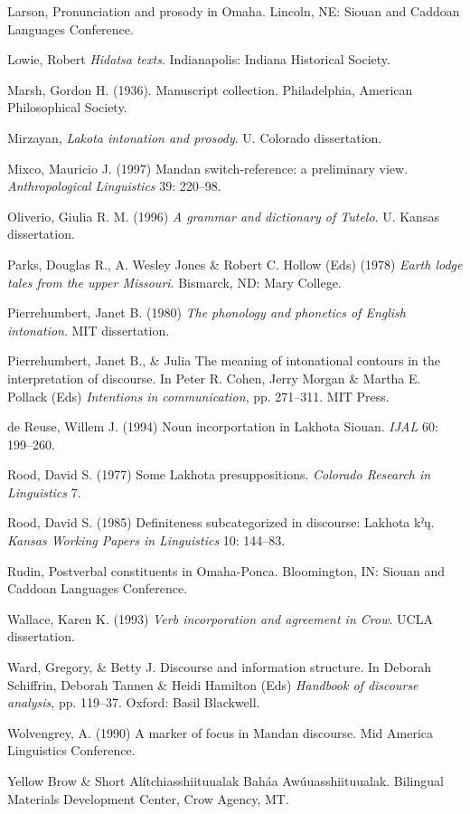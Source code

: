 \documentclass[output=paper]{LSP/langsci}
\begin{document}
\begin{reflist}
Larson, \citet{Rory2009} Pronunciation and prosody in Omaha. Lincoln, NE: Siouan and Caddoan Languages Conference. 

Lowie, Robert \citet{Harry1939} \emph{Hidatsa texts}. Indianapolis: Indiana Historical Society.

Marsh, Gordon H. (1936). Manuscript collection. Philadelphia, American Philosophical Society.

Mirzayan, \citet{Armik2011} \emph{Lakota intonation and prosody}. U. Colorado dissertation.

Mixco, Mauricio J. (1997) Mandan switch-reference: a preliminary view. \emph{Anthropological Linguistics} 39: 220--98.

Oliverio, Giulia R. M. (1996) \emph{A grammar and dictionary of Tutelo}. U. Kansas dissertation.

Parks, Douglas R., A. Wesley Jones \& Robert C. Hollow (Eds) (1978) \emph{Earth lodge tales from the upper Missouri}. Bismarck, ND: Mary College.

Pierrehumbert, Janet B. (1980) \emph{The phonology and phonetics of English intonation}. MIT dissertation.

Pierrehumbert, Janet B., \& Julia \citet{Hirschberg1990} The meaning of intonational contours in the interpretation of discourse. In Peter R. Cohen, Jerry Morgan \& Martha E. Pollack (Eds) \emph{Intentions in communication}, pp. 271--311. MIT Press.

de Reuse, Willem J. (1994) Noun incorportation in Lakhota Siouan. \emph{IJAL} 60: 199--260.

Rood, David S. (1977) Some Lakhota presuppositions. \emph{Colorado Research in Linguistics} 7.

Rood, David S. (1985) Definiteness subcategorized in discourse: Lakhota kˀų. \emph{Kansas Working Papers in Linguistics} 10: 144--83.

Rudin, \citet{Catherine1998} Postverbal constituents in Omaha-Ponca. Bloomington, IN: Siouan and Caddoan Languages Conference. 

Wallace, Karen K. (1993) \emph{Verb incorporation and agreement in Crow}. UCLA dissertation.

Ward, Gregory, \& Betty J. \citet{Birner2001} Discourse and information structure. In Deborah Schiffrin, Deborah Tannen \& Heidi Hamilton (Eds) \emph{Handbook of discourse analysis}, pp. 119--37. Oxford: Basil Blackwell.

Wolvengrey, A. (1990) A marker of focus in Mandan discourse. Mid America Linguistics Conference.

Yellow Brow \& Short \citet{Bull1980} Alítchiasshiituualak Baháa Awúuasshiituualak. Bilingual Materials Development Center, Crow Agency, MT.


\end{reflist}
\end{document}

